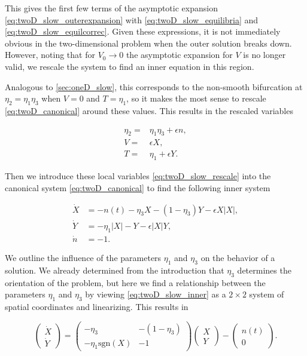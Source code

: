This gives the first few terms of the asymptotic expansion \eqref{eq:twoD_slow_outerexpansion} with \eqref{eq:twoD_slow_equilibria} and \eqref{eq:twoD_slow_equilcorrec}. Given these expressions, it is not immediately obvious in the two-dimensional problem when the outer solution breaks down. However, noting that for $V_0\to 0$ the asymptotic expansion for $V$ is no longer valid, we rescale the system to find an inner equation in this region. 

Analogous to \autoref{sec:oneD_slow}, this corresponds to the non-smooth bifurcation at $\eta_2=\eta_1\eta_3$ when $V=0$ and $T=\eta_1$, so it makes the most sense to rescale \eqref{eq:twoD_canonical} around these values. This results in the rescaled variables

\begin{equation}\label{eq:twoD_slow_rescale}
\begin{aligned}
\eta_2=&\eta_1\eta_3+\epsilon n,\\
V=&\epsilon X,\\
T=&\eta_1+\epsilon Y.
\end{aligned}
\end{equation}

Then we introduce these local variables \eqref{eq:twoD_slow_rescale} into the canonical system \eqref{eq:twoD_canonical} to find the following inner system

\begin{equation}\label{eq:twoD_slow_inner}
\begin{aligned}
   \dot{X} & =  -n(t)-\eta_3 X-(1-\eta_3)Y-\epsilon X|X|, \\
   \dot{Y} & =  -\eta_1 |X|-Y-\epsilon |X|Y,  \\
  \dot{n}  & =  -1.
  \end{aligned}
\end{equation}

We outline the influence of the parameters $\eta_1$ and $\eta_3$ on the behavior of a solution. We already determined from the introduction that $\eta_3$ determines the orientation of the problem, but here we find a relationship between the parameters $\eta_1$ and $\eta_3$ by viewing \eqref{eq:twoD_slow_inner} as a $2\times 2$ system of spatial coordinates and linearizing. This results in 

\begin{equation}\label{eq:twoD_slow_innermatrix}
\begin{pmatrix}
\dot{X}\\
\dot{Y}
\end{pmatrix}=
\begin{pmatrix}
-\eta_3 & -(1-\eta_3) \\ 
-\eta_1\text{sgn}(X) & -1
\end{pmatrix}
\begin{pmatrix}
X\\
Y
\end{pmatrix}-
\begin{pmatrix}
n(t)\\
0
\end{pmatrix}.
\end{equation}

